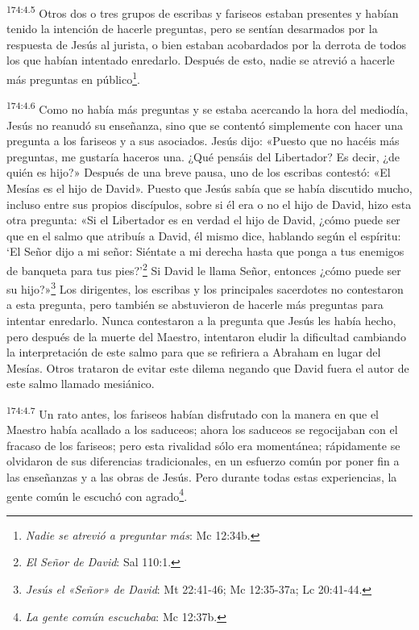 \par
\textsuperscript{174:4.5} Otros dos o tres grupos de escribas y fariseos estaban presentes y habían tenido la intención de hacerle preguntas, pero se sentían desarmados por la respuesta de Jesús al jurista, o bien estaban acobardados por la derrota de todos los que habían intentado enredarlo. Después de esto, nadie se atrevió a hacerle más preguntas en público\footnote{\textit{Nadie se atrevió a preguntar más}: Mc 12:34b.}.

\par
\textsuperscript{174:4.6} Como no había más preguntas y se estaba acercando la hora del mediodía, Jesús no reanudó su enseñanza, sino que se contentó simplemente con hacer una pregunta a los fariseos y a sus asociados. Jesús dijo: «Puesto que no hacéis más preguntas, me gustaría haceros una. ¿Qué pensáis del Libertador? Es decir, ¿de quién es hijo?» Después de una breve pausa, uno de los escribas contestó: «El Mesías es el hijo de David». Puesto que Jesús sabía que se había discutido mucho, incluso entre sus propios discípulos, sobre si él era o no el hijo de David, hizo esta otra pregunta: «Si el Libertador es en verdad el hijo de David, ¿cómo puede ser que en el salmo que atribuís a David, él mismo dice, hablando según el espíritu: `El Señor dijo a mi señor: Siéntate a mi derecha hasta que ponga a tus enemigos de banqueta para tus pies?'\footnote{\textit{El Señor de David}: Sal 110:1.} Si David le llama Señor, entonces ¿cómo puede ser su hijo?»\footnote{\textit{Jesús el «Señor» de David}: Mt 22:41-46; Mc 12:35-37a; Lc 20:41-44.} Los dirigentes, los escribas y los principales sacerdotes no contestaron a esta pregunta, pero también se abstuvieron de hacerle más preguntas para intentar enredarlo. Nunca contestaron a la pregunta que Jesús les había hecho, pero después de la muerte del Maestro, intentaron eludir la dificultad cambiando la interpretación de este salmo para que se refiriera a Abraham en lugar del Mesías. Otros trataron de evitar este dilema negando que David fuera el autor de este salmo llamado mesiánico.

\par
\textsuperscript{174:4.7} Un rato antes, los fariseos habían disfrutado con la manera en que el Maestro había acallado a los saduceos; ahora los saduceos se regocijaban con el fracaso de los fariseos; pero esta rivalidad sólo era momentánea; rápidamente se olvidaron de sus diferencias tradicionales, en un esfuerzo común por poner fin a las enseñanzas y a las obras de Jesús. Pero durante todas estas experiencias, la gente común le escuchó con agrado\footnote{\textit{La gente común escuchaba}: Mc 12:37b.}.


